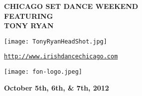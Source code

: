\documentclass[letterpaper]{article}
\begin{document}

\begin{center}
\fontsize{18}{25} \bfseries CHICAGO SET DANCE WEEKEND\\
\fontsize{14}{16} \bfseries{\vspace*{1em}FEATURING\\}
\fontsize{20}{30}\bfseries TONY RYAN\\
\end{center}

\vspace*{0.45em}
\vspace*{0.45em}
\begin{center}
\texttt{[image: TonyRyanHeadShot.jpg]}
\end{center}

\begin{center}
\vspace*{2em}
{\normalsize \href{http://www.irishdancechicago.com}{\tt http://www.irishdancechicago.com} }
\end{center}
\begin{center}
\texttt{[image: fon-logo.jpeg]}
\end{center}
\begin{center}
\sffamily
\fontsize{14}{16} \bfseries{October 5th, 6th, \&  7th, 2012}
\end{center}
 
\end{document}
